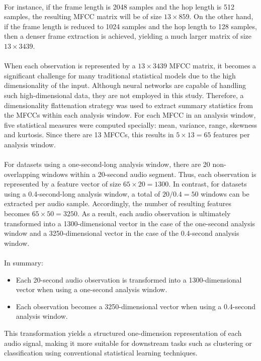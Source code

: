 \\
For instance, if the frame length is 2048 samples and the hop length is 512 samples, the resulting MFCC matrix will be of size $13 \times 859$. On the other hand, if the frame length is reduced to 1024 samples and the hop length to 128 samples, then a denser frame extraction is achieved, yielding a much larger matrix of size $13 \times 3439$. \\
\\
When each observation is represented by a $13 \times 3439$ MFCC matrix, it becomes a significant challenge for many traditional statistical models due to the high dimensionality of the input. Although neural networks are capable of handling such high-dimensional data, they are not employed in this study. Therefore, a dimensionality flattenation strategy was used to extract summary statistics from the MFCCs within each analysis window. For each MFCC in an analysis window, five statistical measures were computed specially: mean, variance, range, skewness and kurtosis. Since there are 13 MFCCs, this results in $5 \times 13 = 65$ features per analysis window.\\
\\
For datasets using a one-second-long analysis window, there are 20 non-overlapping windows within a 20-second audio segment. Thus, each observation is represented by a feature vector of size $65 \times 20 = 1300$. In contrast, for datasets using a 0.4-second-long analysis window, a total of $20 / 0.4 = 50$ windows can be extracted per audio sample. Accordingly, the number of resulting features becomes $65 \times 50 = 3250$. As a result, each audio observation is ultimately transformed into a 1300-dimensional vector in the case of the one-second analysis window and a 3250-dimensional vector in the case of the 0.4-second analysis window.\\
\\
In summary:
\begin{itemize}
	\item Each 20-second audio observation is transformed into a 1300-dimensional vector when using a one-second analysis window.
	\item Each observation becomes a 3250-dimensional vector when using a 0.4-second analysis window.
\end{itemize}
This transformation yields a structured one-dimension representation of each audio signal, making it more suitable for downstream tasks such as clustering or classification using conventional statistical learning techniques.\\
\\
